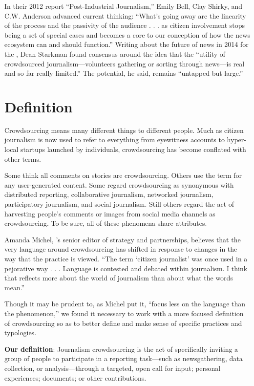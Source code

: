 \begin{itemize}
In their 2012 report ``Post-Industrial Journalism,'' Emily Bell, Clay Shirky, and C.W. Anderson advanced current thinking: ``What’s going away are the linearity of the process and the passivity of the audience . . . as citizen involvement stops being a set of special cases and becomes a core to our conception of how the news ecosystem can and should function.''\autocite{Tow}
Writing about the future of news in 2014 for the , Dean Starkman found consensus around the idea that the ``utility of crowdsourced journalism---volunteers gathering or sorting through news---is real and so far really limited.'' The potential, he said, remains ``untapped but large.''\autocite{CJR}

\chapter{Definition}  

Crowdsourcing means many different things to different people. Much as citizen journalism is now used to refer to everything from eyewitness accounts to hyper-local startups launched by individuals, crowdsourcing has become conflated with other terms.

Some think all comments on stories are crowdsourcing. Others use the term for any user-generated content. Some regard crowdsourcing as synonymous with distributed reporting, collaborative journalism, networked journalism, participatory journalism, and social journalism. Still others regard the act of harvesting people’s comments or images from social media channels as crowdsourcing. To be sure, all of these phenomena share attributes.

Amanda Michel, ’s senior editor of strategy and partnerships, believes that the very language around crowdsourcing has shifted in response to changes in the way that the practice is viewed. ``The term ‘citizen journalist’ was once used in a pejorative way . . . Language is contested and debated within journalism. I think that reflects more about the world of journalism than about what the words mean.''\autocite{Michel}

Though it may be prudent to, as Michel put it, ``focus less on the language than the phenomenon,'' we found it necessary to work with a more focused definition of crowdsourcing so as to better define and make sense of specific practices and typologies. 

\textbf{Our definition}: Journalism crowdsourcing is the act of specifically inviting a group of people to participate in a reporting task---such as newsgathering, data collection, or analysis---through a targeted, open call for input; personal experiences; documents; or other contributions.


\end{itemize}
